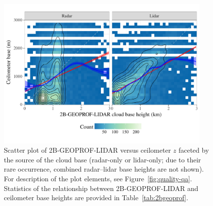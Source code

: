 \documentclass[essd,manuscript]{copernicus}\usepackage[]{graphicx}\usepackage[]{color}
\newenvironment{knitrout}{}{} %
\newcommand\CBH{\ensuremath{z}}
\begin{document}

\begin{figure}
  \centering

\begin{knitrout}
\color{fgcolor}

{\centering \includegraphics[width=0.95\textwidth]{figure/method-eval-2bgeoprof-1} 

}



\end{knitrout}
  \caption{Scatter plot of 2B-GEOPROF-LIDAR versus ceilometer \CBH{}
    faceted by the source of the cloud base (radar-only or lidar-only; due to
    their rare occurrence, combined radar--lidar base heights are not shown).
    For description of the plot elements, see Figure~\ref{fig:quality-qa}.  Statistics of the
    relationship between 2B-GEOPROF-LIDAR and ceilometer base heights are provided in
    Table~\ref{tab:2bgeoprof}.}
  \label{fig:eval-2b}
\end{figure}
\end{document}
